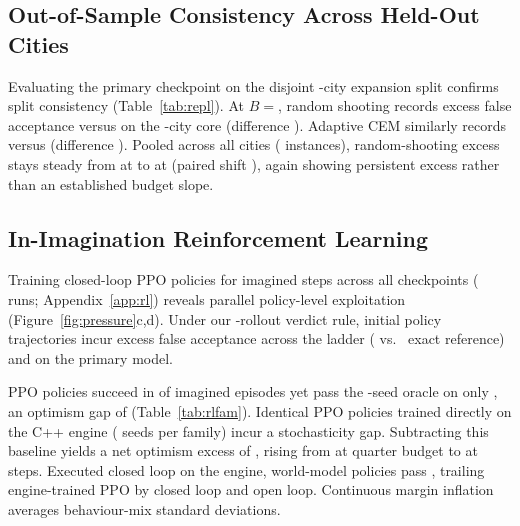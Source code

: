 \subsection{Out-of-Sample Consistency Across \AllCities{} Held-Out Cities}\label{sec:replication}

Evaluating the primary checkpoint on the disjoint \XCities-city expansion split confirms split consistency (Table~\ref{tab:repl}). At $B ={}$, random shooting records \ReplRandThouEightyDiff{} \ci{\ReplRandThouEightyDiffCI} excess false acceptance versus \ReplRandThouFortyDiff{} on the \HeldOutFamilies-city core (difference \ReplRandSizeDiff{} \ci{\ReplRandSizeDiffCI}). Adaptive CEM similarly records \ReplAdThouEightyDiff{} \ci{\ReplAdThouEightyDiffCI} versus \AdThouDiff{} (difference \ReplAdSizeDiff{} \ci{\ReplAdSizeDiffCI}). Pooled across all \AllCities{} cities (\AllInstances{} instances), random-shooting excess stays steady from \ReplRandOneAllDiff{} at  to \ReplRandThouAllDiff{} \ci{\ReplRandThouAllDiffCI} at  (paired shift \ReplRandRiseAll{} \ci{\ReplRandRiseAllCI}), again showing persistent excess rather than an established budget slope.

\subsection{In-Imagination Reinforcement Learning}

Training closed-loop PPO policies \citep{schulman2017ppo} for \RlMonths{} imagined steps across all \RlCkptsDone{} checkpoints (\RlRunsDone{} runs; Appendix~\ref{app:rl}) reveals parallel policy-level exploitation (Figure~\ref{fig:pressure}c,d). Under our \KVerdict-rollout verdict rule, initial policy trajectories incur \RlAxExcess{} \ci{\RlAxExcessCI} excess false acceptance across the ladder (\RlAxHack{} vs.\ \RlAxPerfHack{} exact reference) and \RlMainAxExcess{} \ci{\RlMainAxExcessCI} on the primary model.

PPO policies succeed in \RlDream{} \ci{\RlDreamCI} of imagined episodes yet pass the \OracleSeeds-seed oracle on only \RlOracle{} \ci{\RlOracleCI}, an optimism gap of \RlGap{} \ci{\RlGapCI} (Table~\ref{tab:rlfam}). Identical PPO policies trained directly on the C++ engine (\RlEngSeeds{} seeds per family) incur a \RlEngGap{} stochasticity gap. Subtracting this baseline yields a net optimism excess of \RlGapExcess{} \ci{\RlGapExcessCI}, rising from \RlQtrGap{} at quarter budget to \RlGap{} at \RlMonths{} steps. Executed closed loop on the engine, world-model policies pass \RlClosed{} \ci{\RlClosedCI}, trailing engine-trained PPO by \RlLostClosed{} \ci{\RlLostClosedCI} closed loop and \RlLostFull{} \ci{\RlLostFullCI} open loop. Continuous margin inflation averages \RlInfl{} behaviour-mix standard deviations. \RlInflIntervalSentence{}

